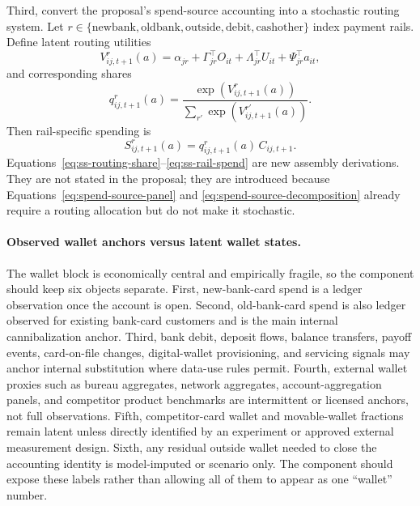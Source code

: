 \documentclass[11pt]{article}
\newcommand{\1}{\mathbf{1}}
\begin{document}
Third, convert the proposal's spend-source accounting into a stochastic routing
system. Let $r\in\{\mathrm{newbank},\mathrm{oldbank},\mathrm{outside},\mathrm{debit},\mathrm{cashother}\}$
index payment rails. Define latent routing utilities
\begin{equation}
  V^{r}_{ij,t+1}(a)
  =
  \alpha_{jr} + \Gamma_{jr}^{\top}O_{it} + \Lambda_{jr}^{\top}U_{it}
  + \Psi_{jr}^{\top}a_{it},
  \label{eq:ss-routing-utility}
\end{equation}
and corresponding shares
\begin{equation}
  q^r_{ij,t+1}(a)
  =
  \frac{\exp(V^r_{ij,t+1}(a))}{\sum_{r'}\exp(V^{r'}_{ij,t+1}(a))}.
  \label{eq:ss-routing-share}
\end{equation}
Then rail-specific spending is
\begin{equation}
  S^r_{ij,t+1}(a) = q^r_{ij,t+1}(a)\,C_{ij,t+1}.
  \label{eq:ss-rail-spend}
\end{equation}
Equations~\eqref{eq:ss-routing-share}--\eqref{eq:ss-rail-spend} are new
assembly derivations. They are not stated in the proposal; they are introduced
because Equations~\eqref{eq:spend-source-panel} and
\eqref{eq:spend-source-decomposition} already require a routing allocation but
do not make it stochastic.

\paragraph{Observed wallet anchors versus latent wallet states.}
The wallet block is economically central and empirically fragile, so the
component should keep six objects separate. First, new-bank-card spend is a
ledger observation once the account is open. Second, old-bank-card spend is also
ledger observed for existing bank-card customers and is the main internal
cannibalization anchor. Third, bank debit, deposit flows, balance transfers,
payoff events, card-on-file changes, digital-wallet provisioning, and servicing
signals may anchor internal substitution where data-use rules permit. Fourth,
external wallet proxies such as bureau aggregates, network aggregates,
account-aggregation panels, and competitor product benchmarks are intermittent
or licensed anchors, not full observations. Fifth, competitor-card wallet and
movable-wallet fractions remain latent unless directly identified by an
experiment or approved external measurement design. Sixth, any residual outside
wallet needed to close the accounting identity is model-imputed or scenario
only. The component should expose these labels rather than allowing all of them
to appear as one ``wallet'' number.
\end{document}
